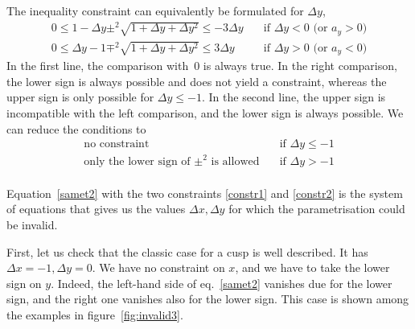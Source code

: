 \documentclass{article}
\begin{document}
The inequality constraint can equivalently be formulated for $\Delta y$,
%
\begin{equation}
  \begin{aligned}
  0 \leq 1-\Delta y \pm^2 \sqrt{1+\Delta y+\Delta y^2} \leq -3\Delta y &\quad\text{if $\Delta y < 0$ (or $a_y > 0$)} \\
  0 \leq \Delta y-1 \mp^2 \sqrt{1+\Delta y+\Delta y^2} \leq  3\Delta y &\quad\text{if $\Delta y > 0$ (or $a_y < 0$)}
  \end{aligned}
\end{equation}
%
In the first line, the comparison with~$0$ is always true. In the right
comparison, the lower sign is always possible and does not yield a constraint,
whereas the upper sign is only possible for $\Delta y \leq -1$. In the second
line, the upper sign is incompatible with the left comparison, and the lower
sign is always possible. We can reduce the conditions to
%
\begin{equation}
  \label{constr2}
  \begin{aligned}
  \text{no constraint} &\quad\text{if $\Delta y \leq -1$} \\
  \text{only the lower sign of $\pm^2$ is allowed} &\quad\text{if $\Delta y > -1$} \\
  \end{aligned}
\end{equation}
%

Equation~\eqref{samet2} with the two constraints \eqref{constr1} and
\eqref{constr2} is the system of equations that gives us the values $\Delta x,
\Delta y$ for which the parametrisation could be invalid.

First, let us check that the classic case for a cusp is well described. It has
$\Delta x=-1, \Delta y=0$. We have no constraint on $x$, and we have to take the
lower sign on $y$. Indeed, the left-hand side of eq.~\eqref{samet2} vanishes due
for the lower sign, and the right one vanishes also for the lower sign. This
case is shown among the examples in figure~\ref{fig:invalid3}.
\end{document}

